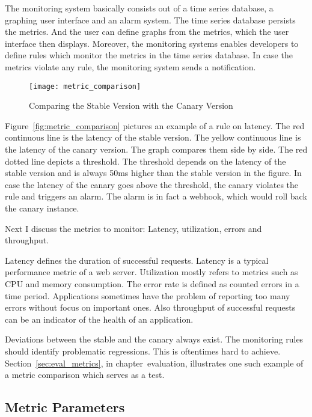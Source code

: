 The monitoring system basically consists out of a time series database, a graphing user
interface and an alarm system. The time series database persists the metrics. And the user
can define graphs from the metrics, which the user interface then displays. Moreover, the
monitoring systems enables developers to define rules which monitor the metrics in the
time series database. In case the metrics violate any rule, the monitoring system sends a
notification.

\begin{figure}[htbp]
  \centering
  \texttt{[image: metric\_comparison]}
  \caption{Comparing the Stable Version with the Canary Version}
  \label{fig:metrics_comparison}
\end{figure}

Figure~\ref{fig:metric_comparison} pictures an example of a rule on latency. The red
continuous line is the latency of the stable version. The yellow continuous line is the
latency of the canary version. The graph compares them side by side. The red dotted line
depicts a threshold. The threshold depends on the latency of the stable version and is
always 50ms higher than the stable version in the figure. In case the latency of the
canary goes above the threshold, the canary violates the rule and triggers an alarm. The
alarm is in fact a webhook, which would roll back the canary instance.

Next I discuss the metrics to monitor: Latency, utilization, errors and throughput.

Latency defines the duration of successful requests. Latency is a typical performance
metric of a web server. Utilization mostly refers to metrics such as CPU and memory
consumption. The error rate is defined as counted errors in a time period. Applications
sometimes have the problem of reporting too many errors without focus on important
ones. Also throughput of successful requests can be an indicator of the health of an
application.

Deviations between the stable and the canary always exist. The monitoring rules should
identify problematic regressions. This is oftentimes hard to
achieve. Section~\ref{sec:eval_metrics}, in chapter~evaluation, illustrates one such
example of a metric comparison which serves as a test.

\subsection{Metric Parameters}

